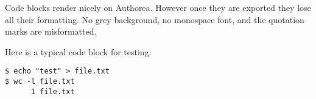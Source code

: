 
Code blocks render nicely on Authorea.
However once they are exported they lose all their formatting.
No grey background, no monospace font, and the quotation marks are misformatted.

Here is a typical code block for testing:

\begin{lstlisting}
$ echo "test" > file.txt
$ wc -l file.txt
      1 file.txt
\end{lstlisting}
